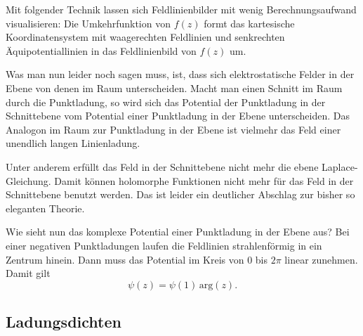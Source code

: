 \documentclass[a4paper,10pt,fleqn,twocolumn,twoside]{article}
\begin{document}
Mit folgender Technik lassen sich Feldlinienbilder mit wenig
Berechnungsaufwand visualisieren: Die Umkehrfunktion von $f(z)$
formt das kartesische Koordinatensystem mit waagerechten Feldlinien
und senkrechten Äquipotentiallinien in das Feldlinienbild
von $f(z)$ um.

Was man nun leider noch sagen muss, ist, dass sich elektrostatische
Felder in der Ebene von denen im Raum unterscheiden. Macht man
einen Schnitt im Raum durch die Punktladung, so wird sich das
Potential der Punktladung
in der Schnittebene vom Potential einer Punktladung in der Ebene
unterscheiden. Das Analogon im Raum zur Punktladung in der Ebene ist
vielmehr das Feld einer unendlich langen Linienladung.

Unter anderem erfüllt das Feld in der Schnittebene nicht mehr die
ebene Laplace-Gleichung. Damit können holomorphe Funktionen nicht mehr
für das Feld in der Schnittebene benutzt werden. Das ist leider ein
deutlicher Abschlag zur bisher so eleganten Theorie.

Wie sieht nun das komplexe Potential einer Punktladung in der Ebene
aus? Bei einer negativen Punktladungen laufen die Feldlinien
strahlenförmig in ein Zentrum hinein. Dann muss das Potential
im Kreis von $0$ bis $2\pi$ linear zunehmen. Damit
gilt
\[\psi(z) = \psi(1)\,\mathrm{arg}(z).\]

\subsection{Ladungsdichten}
\end{document}
